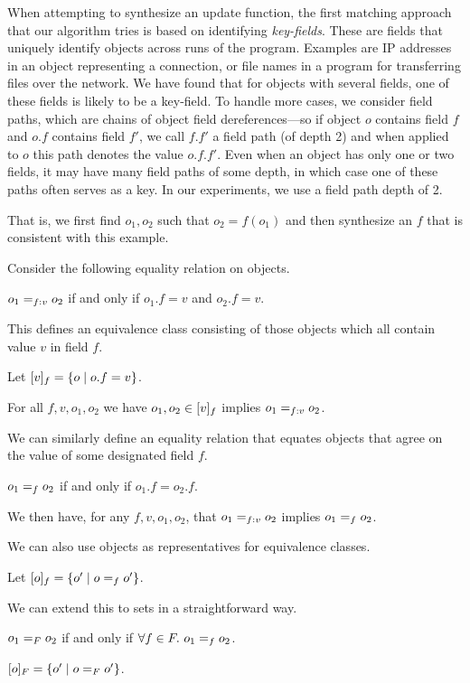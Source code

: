 When attempting to synthesize an update function, the first matching approach that our algorithm tries is based on identifying \emph{key-fields}.  These are fields that uniquely identify objects across runs of the program.  Examples are IP addresses in an object representing a connection, or file names in a program for transferring files over the network.  We have found that for objects with several fields, one of these fields is likely to be a key-field.  To handle more cases, we consider field paths, which are chains of object field dereferences---so if object $o$ contains field $f$ and $o.f$ contains field $f'$, we call $f.f'$ a field path (of depth 2) and when applied to $o$ this path denotes the value $o.f.f'$.  Even when an object has only one or two fields, it may have many field paths of some depth, in which case one of these paths often serves as a key.  In our experiments, we use a field path depth of 2.



That is, we first find $o_1, o_2$ such that $o_2 = f(o_1)$ and then synthesize an $f$ that is consistent with this example.

Consider the following equality relation on objects.
\begin{defn}
$o_1 \eqfv{f}{v} o_2$ if and only if $o_1.f = v$ and $o_2.f = v$.
\end{defn}

This defines an equivalence class consisting of those objects which all contain value $v$ in field $f$.
\begin{defn}
Let $\eqfvclass{f}{v} = \{o \mid o.f = v\}$.
\end{defn}
For all $f, v, o_1, o_2$ we have $o_1, o_2 \in \eqfvclass{f}{v}$ implies $o_1 \eqfv{f}{v} o_2$.

We can similarly define an equality relation that equates objects that agree on the value of some designated field $f$.
\begin{defn}
$o_1 \eqf{f} o_2$ if and only if $o_1.f = o_2.f$.
\end{defn}
We then have, for any $f,v,o_1,o_2$, that $o_1 \eqfv{f}{v} o_2$ implies $o_1 \eqf{f} o_2$.

We can also use objects as representatives for equivalence classes.
\begin{defn}
Let $\eqfclass{f}{o} = \{o' \mid o \eqf{f} o'\}$.
\end{defn}

We can extend this to sets in a straightforward way.
\begin{defn}
$o_1 \eqf{\fset} o_2$ if and only if $\A[f \in \fset] o_1 \eqf{f} o_2$.
\end{defn}
\begin{defn}
$\eqfclass{\fset}{o} = \{o' \mid o \eqf{\fset} o'\}$.
\end{defn}



